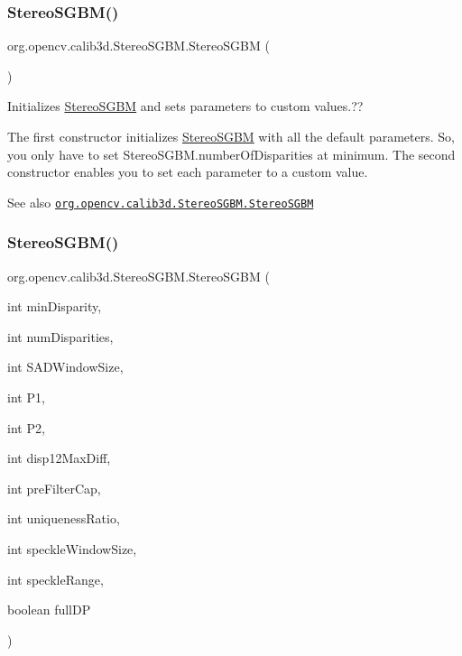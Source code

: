\subsubsection{\texorpdfstring{Stereo\+S\+G\+B\+M()}{StereoSGBM()}\hspace{0.1cm}{\footnotesize\ttfamily [2/4]}}
{\footnotesize\ttfamily org.\+opencv.\+calib3d.\+Stereo\+S\+G\+B\+M.\+Stereo\+S\+G\+BM (\begin{DoxyParamCaption}{ }\end{DoxyParamCaption})}

Initializes {\ttfamily \mbox{\hyperlink{classorg_1_1opencv_1_1calib3d_1_1_stereo_s_g_b_m}{Stereo\+S\+G\+BM}}} and sets parameters to custom values.??

The first constructor initializes {\ttfamily \mbox{\hyperlink{classorg_1_1opencv_1_1calib3d_1_1_stereo_s_g_b_m}{Stereo\+S\+G\+BM}}} with all the default parameters. So, you only have to set {\ttfamily Stereo\+S\+G\+B\+M.\+number\+Of\+Disparities} at minimum. The second constructor enables you to set each parameter to a custom value.

\begin{DoxySeeAlso}{See also}
\href{http://docs.opencv.org/modules/calib3d/doc/camera_calibration_and_3d_reconstruction.html#stereosgbm-stereosgbm}{\tt org.\+opencv.\+calib3d.\+Stereo\+S\+G\+B\+M.\+Stereo\+S\+G\+BM} 
\end{DoxySeeAlso}
\mbox{\label{classorg_1_1opencv_1_1calib3d_1_1_stereo_s_g_b_m_a64c7dbc911b7e91e856c54d0a909ba70}} 
\subsubsection{\texorpdfstring{Stereo\+S\+G\+B\+M()}{StereoSGBM()}\hspace{0.1cm}{\footnotesize\ttfamily [3/4]}}
{\footnotesize\ttfamily org.\+opencv.\+calib3d.\+Stereo\+S\+G\+B\+M.\+Stereo\+S\+G\+BM (\begin{DoxyParamCaption}\item[{int}]{min\+Disparity,  }\item[{int}]{num\+Disparities,  }\item[{int}]{S\+A\+D\+Window\+Size,  }\item[{int}]{P1,  }\item[{int}]{P2,  }\item[{int}]{disp12\+Max\+Diff,  }\item[{int}]{pre\+Filter\+Cap,  }\item[{int}]{uniqueness\+Ratio,  }\item[{int}]{speckle\+Window\+Size,  }\item[{int}]{speckle\+Range,  }\item[{boolean}]{full\+DP }\end{DoxyParamCaption})}

